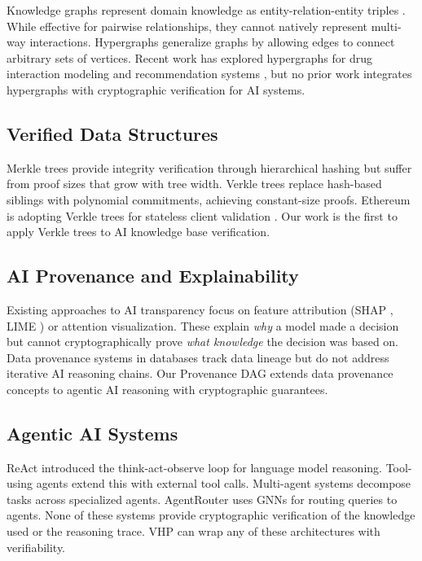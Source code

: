 \documentclass[11pt,a4paper]{article}
\begin{document}
Knowledge graphs represent domain knowledge as entity-relation-entity triples \citep{pan2024llmkg}. While effective for pairwise relationships, they cannot natively represent multi-way interactions. Hypergraphs \citep{bretto2013hypergraph} generalize graphs by allowing edges to connect arbitrary sets of vertices. Recent work has explored hypergraphs for drug interaction modeling \citep{feng2020hypergraph} and recommendation systems \citep{yu2021self}, but no prior work integrates hypergraphs with cryptographic verification for AI systems.

\subsection{Verified Data Structures}

Merkle trees \citep{merkle1979} provide integrity verification through hierarchical hashing but suffer from proof sizes that grow with tree width. Verkle trees \citep{kuszmaul2019verkle} replace hash-based siblings with polynomial commitments, achieving constant-size proofs. Ethereum is adopting Verkle trees for stateless client validation \citep{buterin2021verkle}. Our work is the first to apply Verkle trees to AI knowledge base verification.

\subsection{AI Provenance and Explainability}

Existing approaches to AI transparency focus on feature attribution (SHAP \citep{lundberg2017shap}, LIME \citep{ribeiro2016lime}) or attention visualization. These explain \textit{why} a model made a decision but cannot cryptographically prove \textit{what knowledge} the decision was based on. Data provenance systems in databases \citep{buneman2001provenance} track data lineage but do not address iterative AI reasoning chains. Our Provenance DAG extends data provenance concepts to agentic AI reasoning with cryptographic guarantees.

\subsection{Agentic AI Systems}

ReAct \citep{yao2023react} introduced the think-act-observe loop for language model reasoning. Tool-using agents \citep{schick2024toolformer} extend this with external tool calls. Multi-agent systems \citep{wu2023autogen, hong2023metagpt} decompose tasks across specialized agents. AgentRouter \citep{agentrouterr2025} uses GNNs for routing queries to agents. None of these systems provide cryptographic verification of the knowledge used or the reasoning trace. VHP can wrap any of these architectures with verifiability.
\end{document}
